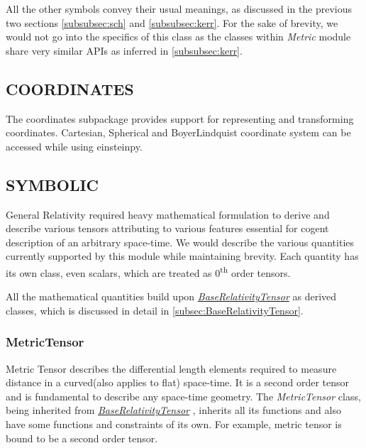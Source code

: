 \documentclass{aastex63}
\begin{document}
All the other symbols convey their usual meanings, as discussed in the previous two sections \ref{subsubsec:sch} and \ref{subsubsec:kerr}. For the sake of brevity, we would not go into the specifics of this class as the classes within \textit{Metric} module share very similar APIs as inferred in \ref{subsubsec:kerr}.

\subsection{COORDINATES}
The coordinates subpackage provides support for representing and transforming coordinates. Cartesian, Spherical and BoyerLindquist coordinate system can be accessed while using einsteinpy.

\subsection{SYMBOLIC}
General Relativity required heavy mathematical formulation to derive and describe various tensors attributing to various features essential for cogent description of an arbitrary space-time. We would describe the various quantities currently supported by this module while maintaining brevity. Each quantity has its own class, even scalars, which are treated as 0\textsuperscript{th} order tensors.

All the mathematical quantities build upon \hyperref[subsec:BaseRelativityTensor]{\textit{BaseRelativityTensor}} as derived classes, which is discussed in detail in \ref{subsec:BaseRelativityTensor}. 

\subsubsection{MetricTensor}\label{subsubsec:metric}
Metric Tensor describes the differential length elements required to measure distance in a curved(also applies to flat) space-time. It is a second order tensor and is fundamental to describe any space-time geometry. The \textit{MetricTensor} class, being inherited from \hyperref[subsec:BaseRelativityTensor]{\textit{BaseRelativityTensor}} , inherits all its functions and also have some functions and constraints of its own. For example, metric tensor is bound to be a second order tensor.

\end{document}
